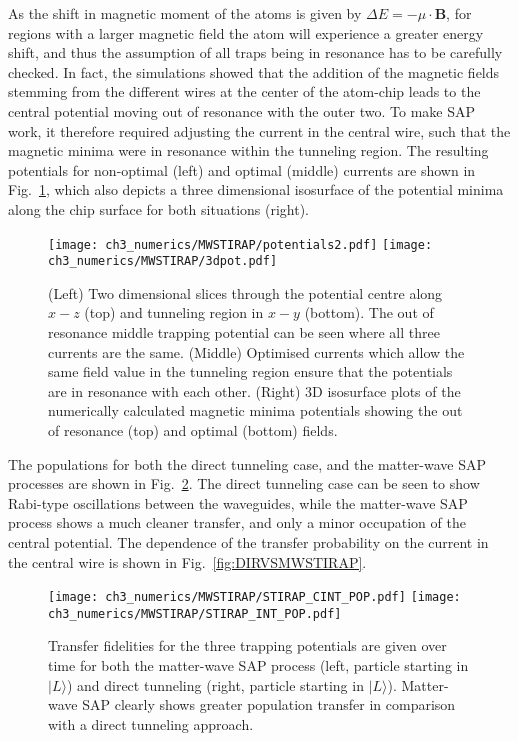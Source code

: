 As the shift in magnetic moment of the atoms is given by $\Delta E = -\mu\cdot\mathbf{B}$, for regions with a larger magnetic field the atom will experience a greater energy shift, and thus the assumption of all traps being in resonance has to be carefully checked. In fact, the simulations showed that the addition of the magnetic fields stemming from the different wires at the center of the atom-chip leads to the central potential moving out of resonance with the outer two. To make SAP work, it therefore required adjusting the current in the central wire, such that the magnetic minima were in resonance within the tunneling region. The resulting potentials for non-optimal (left) and optimal (middle) currents are shown in Fig.~\ref{fig:equaloptcurrent}, which also depicts a three dimensional isosurface of the potential minima along the chip surface for both situations (right).

\begin{figure}[tb]
    \centering
  \texttt{[image: ch3\_numerics/MWSTIRAP/potentials2.pdf]}
  \texttt{[image: ch3\_numerics/MWSTIRAP/3dpot.pdf]}
  \caption{(Left) Two dimensional slices through the potential centre along $x-z$ (top) and tunneling region in $x-y$ (bottom). The out of resonance middle trapping potential can be seen where all three currents are the same. (Middle) Optimised currents which allow the same field value in the tunneling region ensure that the potentials are in resonance with each other. (Right) 3D isosurface plots of the numerically calculated magnetic minima potentials showing the out of resonance (top) and optimal (bottom) fields.}
  \label{fig:equaloptcurrent}
\end{figure}
The populations for both the direct tunneling case, and the matter-wave SAP processes are shown in Fig.~\ref{fig:mwsVsDT}. The direct tunneling case can be seen to show Rabi-type oscillations between the waveguides, while the matter-wave SAP process shows a much cleaner transfer, and only a minor occupation of the central potential. The dependence of the transfer probability on the current in the central wire is shown in Fig.~\ref{fig:DIRVSMWSTIRAP}.


\begin{figure}[tb]
    \centering
  \texttt{[image: ch3\_numerics/MWSTIRAP/STIRAP\_CINT\_POP.pdf]}
  \texttt{[image: ch3\_numerics/MWSTIRAP/STIRAP\_INT\_POP.pdf]}
  \caption{Transfer fidelities for the three trapping potentials are given over time for both the matter-wave SAP process (left, particle starting in $ |L\rangle$) and direct tunneling (right, particle starting in $ |L\rangle$). Matter-wave SAP clearly shows greater population transfer in comparison with a direct tunneling approach.}
  \label{fig:mwsVsDT}
\end{figure}

